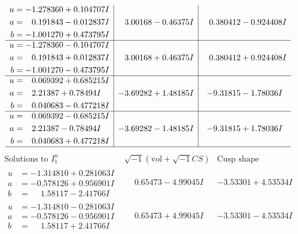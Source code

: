 \documentclass[1p]{elsarticle_modified}
\theoremstyle{definition}
\newcommand{\I}{\sqrt{-1}}
\begin{document}
$$\begin{array}{c|c|c}
\begin{aligned}
u &= -1.278360 + 0.104707 I \\
a &= \phantom{-}0.191843 - 0.012837 I \\
b &= -1.001270 + 0.473795 I\end{aligned}
 & \phantom{-}3.00168 - 0.46375 I & \phantom{-}0.380412 - 0.924408 I \\ \hline\begin{aligned}
u &= -1.278360 - 0.104707 I \\
a &= \phantom{-}0.191843 + 0.012837 I \\
b &= -1.001270 - 0.473795 I\end{aligned}
 & \phantom{-}3.00168 + 0.46375 I & \phantom{-}0.380412 + 0.924408 I \\ \hline\begin{aligned}
u &= \phantom{-}0.069392 + 0.685215 I \\
a &= \phantom{-}2.21387 + 0.78494 I \\
b &= \phantom{-}0.040683 - 0.477218 I\end{aligned}
 & -3.69282 + 1.48185 I & -9.31815 - 1.78036 I \\ \hline\begin{aligned}
u &= \phantom{-}0.069392 - 0.685215 I \\
a &= \phantom{-}2.21387 - 0.78494 I \\
b &= \phantom{-}0.040683 + 0.477218 I\end{aligned}
 & -3.69282 - 1.48185 I & -9.31815 + 1.78036 I\\
 \hline 
 \end{array}$$\newpage$$\begin{array}{c|c|c}  
\text{Solutions to }I^u_{1}& \I (\text{vol} + \sqrt{-1}CS) & \text{Cusp shape}\\
 \hline 
\begin{aligned}
u &= -1.314810 + 0.281063 I \\
a &= -0.578126 + 0.956901 I \\
b &= \phantom{-}1.58117 - 2.41766 I\end{aligned}
 & \phantom{-}0.65473 - 4.99045 I & -3.53301 + 4.53534 I \\ \hline\begin{aligned}
u &= -1.314810 - 0.281063 I \\
a &= -0.578126 - 0.956901 I \\
b &= \phantom{-}1.58117 + 2.41766 I\end{aligned}
 & \phantom{-}0.65473 + 4.99045 I & -3.53301 - 4.53534 I \\ \hline\begin{aligned}

\end{aligned}
\end{array}$$
\end{document}
